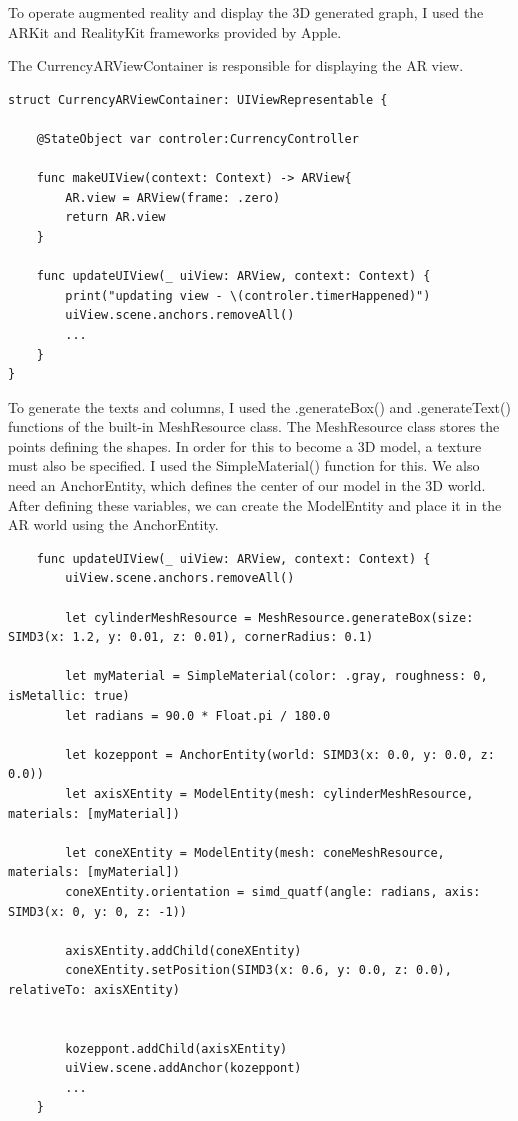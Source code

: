 \documentclass[11pt,a4paper,oneside]{report}
\begin{document}
To operate augmented reality and display the 3D generated graph, I used the ARKit and RealityKit frameworks provided by Apple.

The CurrencyARViewContainer is responsible for displaying the AR view.

\begin{lstlisting}
struct CurrencyARViewContainer: UIViewRepresentable {
    
    @StateObject var controler:CurrencyController
    
    func makeUIView(context: Context) -> ARView{
        AR.view = ARView(frame: .zero)
        return AR.view
    }
    
    func updateUIView(_ uiView: ARView, context: Context) {
        print("updating view - \(controler.timerHappened)")
        uiView.scene.anchors.removeAll()
        ...
    }
}
\end{lstlisting}

To generate the texts and columns, I used the .generateBox() and .generateText() functions of the built-in MeshResource class.
The MeshResource class stores the points defining the shapes. In order for this to become a 3D model, a texture must also be specified. I used the SimpleMaterial() function for this.
We also need an AnchorEntity, which defines the center of our model in the 3D world.
After defining these variables, we can create the ModelEntity and place it in the AR world using the AnchorEntity.

\begin{lstlisting}
    func updateUIView(_ uiView: ARView, context: Context) {
        uiView.scene.anchors.removeAll()
        
        let cylinderMeshResource = MeshResource.generateBox(size: SIMD3(x: 1.2, y: 0.01, z: 0.01), cornerRadius: 0.1)
        
        let myMaterial = SimpleMaterial(color: .gray, roughness: 0, isMetallic: true)
        let radians = 90.0 * Float.pi / 180.0
            
        let kozeppont = AnchorEntity(world: SIMD3(x: 0.0, y: 0.0, z: 0.0))
        let axisXEntity = ModelEntity(mesh: cylinderMeshResource, materials: [myMaterial])
        
        let coneXEntity = ModelEntity(mesh: coneMeshResource, materials: [myMaterial])
        coneXEntity.orientation = simd_quatf(angle: radians, axis: SIMD3(x: 0, y: 0, z: -1))
        
        axisXEntity.addChild(coneXEntity)
        coneXEntity.setPosition(SIMD3(x: 0.6, y: 0.0, z: 0.0), relativeTo: axisXEntity)
        
        
        kozeppont.addChild(axisXEntity)
        uiView.scene.addAnchor(kozeppont)
        ...
    }
\end{lstlisting}
\end{document}
